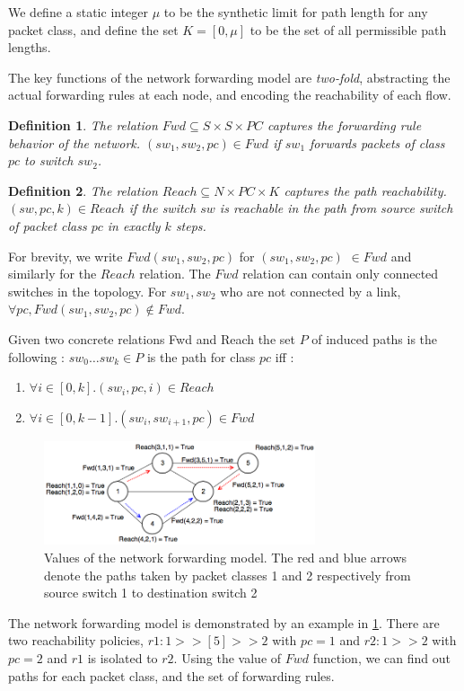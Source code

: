 \documentclass[]{sig}
\newtheorem{mydef}{Definition}
\begin{document}
We define a static integer $\mu$ to be the synthetic limit for path length for any packet class, and define the set $K = [0, \mu]$ to be the set of all permissible path lengths.

The key functions of the network forwarding model are \emph{two-fold}, abstracting the actual forwarding rules at each node, and encoding the reachability of each flow. 
\begin{mydef}
\label{def:fwd}
The relation $Fwd \subseteq S \times S \times PC $ captures the forwarding rule behavior of the network. 
$(sw_1, sw_2, pc)\in Fwd$ if 
$sw_1$ forwards packets of class $pc$ to switch $sw_2$. 
\end{mydef}
\begin{mydef}
\label{def:reach}
	The relation $Reach \subseteq N \times PC \times K$ captures the path reachability.   
	$(sw, pc, k)\in Reach$ if 
	the switch $sw$ is reachable in the path from source switch of packet class $pc$ in exactly $k$ steps.  
\end{mydef}
For brevity, we write $Fwd(sw_1, sw_2, pc)$ for $(sw_1, sw_2, pc) $ $\in Fwd$ and similarly for the $Reach$ relation. The $Fwd$ relation can contain only connected switches in the topology. For $sw_1, sw_2$ who are not connected by a link, $\forall pc, Fwd(sw_1,sw_2,pc) \notin Fwd$. 

Given two concrete relations Fwd and Reach the set $P$ of induced paths is the following : 
$sw_0 \ldots sw_k \in P$ is the path for class $pc$ iff : 
\begin{enumerate}
	\item $\forall i \in [0,k]. (sw_i, pc, i) \in Reach$
	\item $\forall i \in [0, k - 1]. (sw_i, sw_{i+1}, pc) \in Fwd$
\end{enumerate}

\begin{figure}[H]
	\includegraphics[width=8cm]{topoF.png}
	\caption{Values of the network forwarding model. The red and blue arrows denote the paths taken by packet classes 1 and 2 respectively from source switch 1 to destination switch 2}
	\label{fig:model}
\end{figure}
The network forwarding model is demonstrated by an example in \cref{fig:model}. There are two reachability policies, $r1 : 1 >> [5] >> 2$ with $pc=1$ and $r2 : 1 >> 2$ with $pc=2$ and $r1$ is isolated to $r2$. Using the value of $Fwd$ function, we can find out paths for each packet class, and the set of forwarding rules. 
\end{document}
